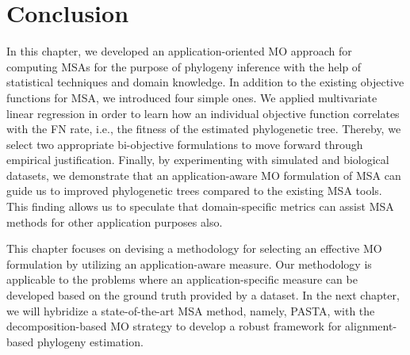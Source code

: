  \section{Conclusion} \label{sec:cyb-conclusion}
In this chapter, we developed an application-oriented MO approach for computing MSAs for the purpose of phylogeny inference with the help of statistical techniques and domain knowledge. In addition to the existing objective functions for MSA, we introduced four simple ones. 
We applied multivariate linear regression in order to learn how an individual objective function correlates with the FN rate, i.e., the fitness of the estimated phylogenetic tree. Thereby, we select two appropriate bi-objective formulations to move forward through empirical justification. Finally, by experimenting with simulated and biological datasets, we demonstrate that an application-aware MO formulation of MSA can guide us to improved phylogenetic trees compared to the existing MSA tools. This finding allows us to speculate that domain-specific metrics can assist MSA methods for other application purposes also. 

This chapter focuses on devising a methodology for selecting an effective MO formulation by utilizing an application-aware measure.  Our methodology is applicable to the problems where an application-specific measure can be developed based on the ground truth provided by a dataset. In the next chapter, we will hybridize a state-of-the-art MSA method, namely, PASTA,  with the decomposition-based MO strategy to develop a robust framework for alignment-based phylogeny estimation. 




